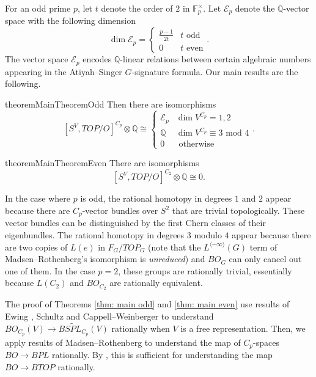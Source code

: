 \documentclass[11pt, twoside]{amsart}
\theoremstyle{plain}
\theoremstyle{definition}
\theoremstyle{remark}
\newcommand{\Q}{\mathbb Q}
\newcommand{\F}{\mathbb F}
\newcommand{\mc}[1]{\mathcal{{#1}}}
\begin{document}
For an odd prime $p$, let $t$ denote the order of $2$ in $\F_p^\times$.
Let $\mc{E}_p$ denote the $\Q$-vector space with the following dimension
\[
\dim\mc{E}_p=\begin{cases}
\frac{p-1}{2t}&t\text{ odd}\\
0&t\text{ even}
\end{cases}.
\]
The vector space $\mc{E}_p$ encodes $\Q$-linear relations between certain algebraic numbers appearing in the Atiyah--Singer $G$-signature formula.
Our main results are the following.

\begin{restatable}{theorem}{MainTheoremOdd}\label{thm: main odd}
Then there are isomorphisms
\[
[S^V, TOP/ O]^{C_p}\otimes\Q\cong\begin{cases}\mc{E}_p&\dim V^{C_p}=1,2\\ \Q&\dim V^{C_p}\equiv 3\text{ mod }4\\0&\text{ otherwise}\end{cases}.
\]
\end{restatable}

\begin{restatable}{theorem}{MainTheoremEven}\label{thm: main even}
There are isomorphisms
\[
[S^V, TOP/ O]^{C_2}\otimes\Q\cong 0.
\]
\end{restatable}

In the case where $p$ is odd, the rational homotopy in degrees $1$ and $2$ appear because there are $C_p$-vector bundles over $S^2$ that are trivial topologically.
These vector bundles can be distinguished by the first Chern classes of their eigenbundles.
The rational homotopy in degrees $3$ modulo $4$ appear because there are two copies of $L(e)$ in $F_G/ TOP_G$ (note that the $L^{\langle-\infty\rangle}(G)$ term of Madsen--Rothenberg's isomorphism is \emph{unreduced}) and $BO_G$ can only cancel out one of them.
In the case $p=2$, these groups are rationally trivial, essentially because $L(C_2)$ and $BO_{C_2}$ are rationally equivalent.

The proof of Theorems \ref{thm: main odd} and \ref{thm: main even} use results of Ewing \cite{EwingSpheresAsFPSets}, Schultz \cite{SchultzSpherelike} and Cappell--Weinberger \cite{CappellWeinbergerSimpleAS} to understand $BO_{C_p}(V)\to B\widetilde{SPL}_{C_p}(V)$ rationally when $V$ is a free representation.
Then, we apply results of Madsen--Rothenberg \cite{MadsenRothenberg2} to understand the map of $C_p$-spaces $BO\to BPL$ rationally.
By \cite{MadsenRothenbergEquivAut}, this is sufficient for understanding the map $BO\to BTOP$ rationally.
\end{document}

